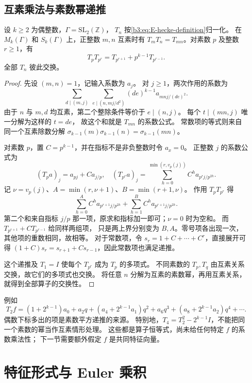 \subsection{互素乘法与素数幂递推}
\label{b3:subsec:E0203}

\begin{proposition}[乘法关系]\label{b3:prop:E-hecke-relations}
设 \(k\ge2\) 为偶整数，\(\Gamma=\mathrm{SL}_2(\mathbb Z)\)，
\(T_n\) 按\eqref{b3:eq:E-hecke-definition}归一化。
在 \(M_k(\Gamma)\) 和 \(S_k(\Gamma)\) 上，正整数 \(m,n\) 互素时有
\(T_mT_n=T_{mn}\)。对素数 \(p\) 及整数 \(r\ge1\)，有
\[
 T_pT_{p^r}=T_{p^{r+1}}+p^{k-1}T_{p^{r-1}}.
\]
全部 \(T_n\) 彼此交换。
\end{proposition}
\begin{proof}
先设 \((m,n)=1\)，记输入系数为 \(a_j\)。
对 \(j\ge1\)，两次作用的系数为
\[
 \sum_{d\mid(m,j)}\ \sum_{e\mid(n,mj/d^2)}
                (de)^{k-1}a_{mnj/(de)^2}.
\]
由于 \(n\) 与 \(m,d\) 均互素，第二个整除条件等价于 \(e\mid(n,j)\)。
每个 \(t\mid(mn,j)\) 唯一分解为这样的 \(t=de\)，
故这个和就是 \(T_{mn}\) 的系数公式。
常数项的等式则来自同一个互素除数分解
\(\sigma_{k-1}(m)\sigma_{k-1}(n)=\sigma_{k-1}(mn)\)。

对素数 \(p\)，置 \(C=p^{k-1}\)，并在指标不是非负整数时令 \(a_x=0\)。
正整数 \(j\) 的系数公式为
\[
 (T_pa)_j=a_{pj}+Ca_{j/p},\quad
 (T_{p^r}a)_j=
 \sum_{h=0}^{\min(r,v_p(j))}C^h a_{p^rj/p^{2h}}.
\]
记 \(\nu=v_p(j)\)、\(A=\min(r,\nu+1)\)、\(B=\min(r+1,\nu)\)。
作用 \(T_pT_{p^r}\) 得
\[
 \sum_{h=0}^{A}C^h a_{p^{r+1}j/p^{2h}}
 +\sum_{h=1}^{B}C^h a_{p^{r+1}j/p^{2h}}.
\]
第二个和来自指标 \(j/p\) 那一项，原求和指标加一即可；\(\nu=0\) 时为空和。
而 \(T_{p^{r+1}}+CT_{p^{r-1}}\) 给同样两组项，
只是两上界分别变为 \(B,A\)。零号项各出现一次，其他项的重数相同，故相等。
对于常数项，令 \(s_r=1+C+\cdots+C^r\)，直接展开可得
\((1+C)s_r=s_{r+1}+Cs_{r-1}\)，因此常数项也满足递推。

这个递推及 \(T_1=I\) 使每个 \(T_{p^r}\) 成为 \(T_p\) 的多项式。
不同素数的 \(T_p,T_q\) 由互素关系交换，故它们的多项式也交换。
将任意 \(n\) 分解为互素的素数幂，再用互素关系，就得到全部算子的交换性。
\end{proof}
例如
\[
 T_2f=(1+2^{k-1})a_0+a_2q
 +(a_4+2^{k-1}a_1)q^2+a_6q^3
 +(a_8+2^{k-1}a_2)q^4+\cdots.
\]
偶数下标多出的项是素数平方递推的来源。
特别地，\(T_4=T_2^2-2^{k-1}I\)，不能把同一个素数的幂当作互素情形处理。
这些都是算子恒等式，尚未给任何特定 \(f\) 的系数乘法性；
下一节需要额外假定 \(f\) 是共同特征向量。

\section{特征形式与 Euler 乘积}
\label{b3:sec:E03}

